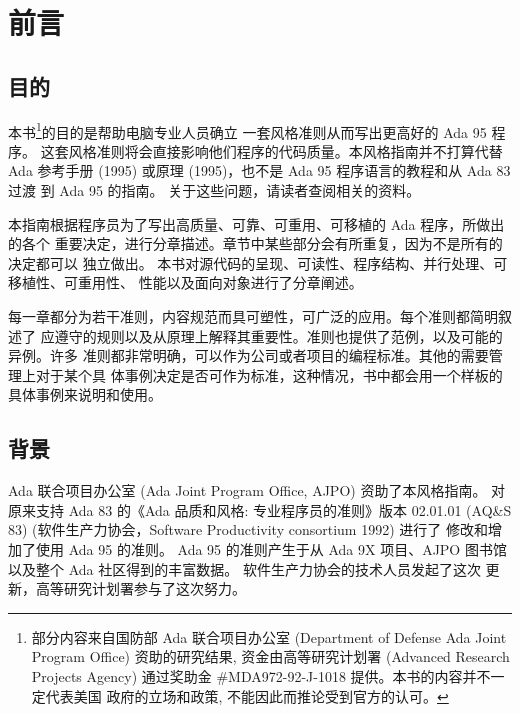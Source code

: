 %
%
%

\chapter{前言}
\pagestyle{empty}

\section{目的}
本书\footnote{部分内容来自国防部 Ada 联合项目办公室 (Department of Defense Ada
Joint Program Office) 资助的研究结果, 资金由高等研究计划署 (Advanced Research
Projects Agency) 通过奖助金 \#MDA972-92-J-1018 提供。本书的内容并不一定代表美国
政府的立场和政策, 不能因此而推论受到官方的认可。}的目的是帮助电脑专业人员确立
一套风格准则从而写出更高好的 Ada 95 程序。
这套风格准则将会直接影响他们程序的代码质量。本风格指南并不打算代替 Ada
参考手册 (1995) 或原理 (1995)，也不是 Ada 95 程序语言的教程和从 Ada 83 过渡
到 Ada 95 的指南。 关于这些问题，请读者查阅相关的资料。

本指南根据程序员为了写出高质量、可靠、可重用、可移植的 Ada 程序，所做出的各个
重要决定，进行分章描述。章节中某些部分会有所重复，因为不是所有的决定都可以
独立做出。 本书对源代码的呈现、可读性、程序结构、并行处理、可移植性、可重用性、
性能以及面向对象进行了分章阐述。

每一章都分为若干准则，内容规范而具可塑性，可广泛的应用。每个准则都简明叙述了
应遵守的规则以及从原理上解释其重要性。准则也提供了范例，以及可能的异例。许多
准则都非常明确，可以作为公司或者项目的编程标准。其他的需要管理上对于某个具
体事例决定是否可作为标准，这种情况，书中都会用一个样板的具体事例来说明和使用。

\section{背景}
Ada 联合项目办公室 (Ada Joint Program Office, AJPO) 资助了本风格指南。
对原来支持 Ada 83 的《Ada 品质和风格: 专业程序员的准则》版本 02.01.01
 (AQ\&S 83) (软件生产力协会，Software Productivity consortium 1992) 进行了
修改和增加了使用 Ada 95 的准则。 Ada 95 的准则产生于从 Ada 9X 项目、AJPO
图书馆以及整个 Ada 社区得到的丰富数据。 软件生产力协会的技术人员发起了这次
更新，高等研究计划署参与了这次努力。

